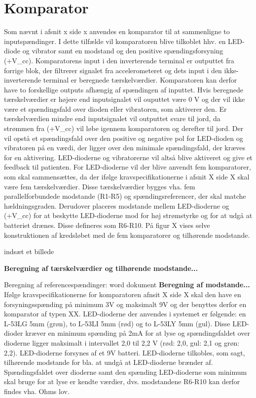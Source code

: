 \section{Komparator}
Som nævnt i afsnit x side x anvendes en komparator til at sammenligne to inputspændinger. %
I dette tilfælde vil komparatoren blive tilkoblet hhv. en LED-diode og vibrator samt en modstand og den positive spændingsforsyning (+V_{cc}). Komparatorens input i den inverterende terminal er outputtet fra forrige blok, der filtrerer signalet fra accelerometeret og dets input i den ikke-inverterende terminal er beregnede tærskelværdier. Komparatoren kan derfor have to forskellige outputs afhængig af spændingen af inputtet. Hvis beregnede tærskelværdier er højere end inputsignalet vil ouputtet være 0 V og der vil ikke være et spændingsfald over dioden eller vibratoren, som aktiverer den. Er tærskelværdien mindre end inputsignalet vil outputtet svare til jord, da strømmen fra (+V_{cc}) vil løbe igennem komparatoren og derefter til jord. Der vil opstå et spændingsfald over den positive og negative pol for LED-dioden og vibratoren på en værdi, der ligger over den minimale spændingsfald, der kræves for en aktivering. LED-dioderne og vibratorerne vil altså blive aktiveret og give et feedback til patienten. 
For LED-dioderne vil der blive anvendt fem komparatorer, som skal sammensættes, da der ifølge kravspecifikationerne i afsnit X side X skal være fem tærskelværdier. Disse tærskelværdier bygges vha. fem parallelforbundede modstande (R1-R5) og spændingsreferencer, der skal matche hældningsgraden. Derudover placeres modstande mellem LED-dioderne og (+V_{cc}) for at beskytte LED-dioderne mod for høj strømstyrke og for at udgå at batteriet drænes. Disse defineres som R6-R10. På figur X vises selve konstruktionen af kredsløbet med de fem komparatorer og tilhørende modstande.

indsæt et billede

\textbf{Beregning af tærskelværdier og tilhørende modstande...}

Beregning af referencespændinger: 
word dokument
\textbf{Beregning af modstande...}
Ifølge kravspecifikationerne for komparatoren afnsit X side X skal den have en forsyningsspænding på minimum 3V og maksimalt 9V og der benyttes derfor en komparator af typen XX. LED-dioderne der anvendes i systemet er følgende: en L-53LG 5mm (grøn), to L-53LI 5mm (rød) og to L-53LY 5mm (gul). Disse LED-dioder kræver en minimum spænding på 2mA for at lyse og spændingsfaldet over dioderne ligger maksimalt i intervallet 2,0 til 2,2 V (rød: 2,0, gul: 2,1 og grøn: 2,2). LED-dioderne forsynes af et 9V batteri. LED-dioderne tilkobles, som sagt, tilhørende modstande for bla. at undgå at LED-dioderne brænder af. Spændingsfaldet over dioderne samt den spænding LED-dioderne som minimum skal bruge for at lyse er kendte værdier, dvs. modstandene R6-R10 kan derfor findes vha. Ohms lov.

